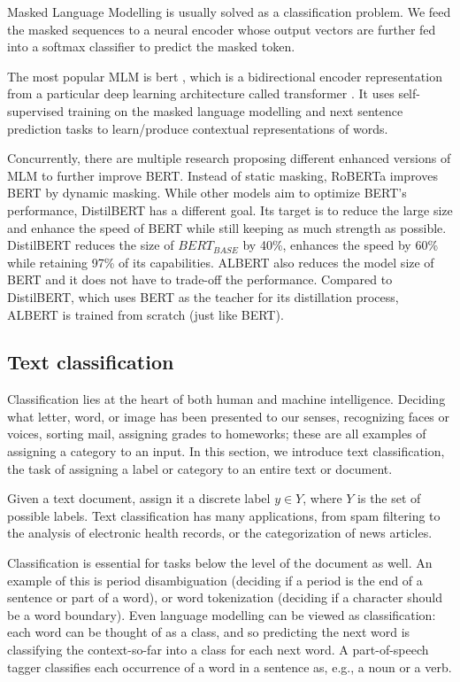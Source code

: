 Masked Language Modelling is usually solved as a classification problem. We feed the masked
sequences to a neural encoder whose output vectors are further fed into a softmax classifier to predict the masked token.

The most popular MLM is \acrshort{bert} \cite{devlin2018bert}, which is a bidirectional encoder representation from a particular deep learning architecture called \gls{transformer} \cite{vaswani2017attention}. 
It uses self-supervised training on the masked language modelling and next sentence prediction tasks to learn/produce contextual representations of words.

Concurrently, there are multiple research proposing different enhanced versions of MLM to further improve BERT. Instead
of static masking, RoBERTa \cite{liu2019roberta} improves BERT by dynamic masking.
While other models aim to optimize BERT's performance, DistilBERT \cite{sanh2019distilbert} has a different goal. Its target is to reduce the large size and enhance the speed of BERT while still keeping as much strength as possible.
DistilBERT reduces the size of $BERT_{BASE}$ by 40\%, enhances the speed by 60\% while retaining 97\% of its capabilities.
ALBERT \cite{lan2019albert} also reduces the model size of BERT and it does not have to trade-off the performance. Compared to DistilBERT, which uses BERT as the teacher for its distillation process, ALBERT is trained from scratch (just like BERT).

\subsection{Text classification}\label{subsec:text-classification}

Classification lies at the heart of both human and machine intelligence. Deciding what letter, word, or image has been presented to our senses, recognizing faces or voices, sorting mail, assigning grades to homeworks; these are all examples of assigning a category to an input.
In this section, we introduce text classification, the task of assigning a label or category to an entire text or document.

Given a text document, assign it a discrete label $y \in Y$, where $Y$ is the set of possible labels. 
Text classification has many applications, from spam filtering to the analysis of electronic health records, or the categorization of news articles.

Classification is essential for tasks below the level of the document as well.
An example of this is period disambiguation (deciding if a period is the end of a sentence or part of a word), or word tokenization (deciding if a character should be a word boundary). Even language modelling can be viewed as classification: each word can be thought of as a class, and so predicting the next word is classifying the context-so-far into a class for each next word. A part-of-speech tagger classifies each occurrence of a word in a sentence as, e.g., a noun or a verb.

